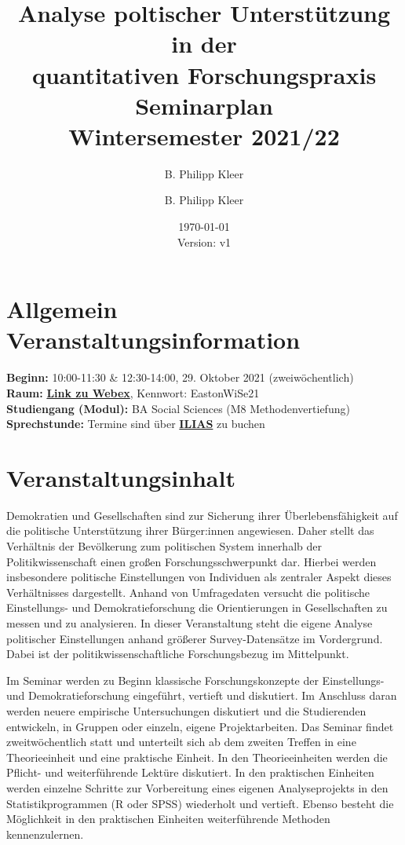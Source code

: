 \documentclass[11pt,a4paper]{article}
\author{B. Philipp Kleer}
\title{%
  Analyse poltischer Unterstützung in der\\quantitativen Forschungspraxis \\
  \large Seminarplan \\
  Wintersemester 2021/22}
\author{B. Philipp Kleer}
\date{\today \\ \small{Version: v1}}
\begin{document}
\maketitle

\section*{Allgemein Veranstaltungsinformation}
\textbf{Beginn:} 10:00-11:30 \& 12:30-14:00, 29. Oktober 2021 (zweiwöchentlich) \\
\textbf{Raum:} \href{https://uni-giessen.webex.com/uni-giessen/j.php?MTID=md4723c890a79880413a03711535386ad}{\textbf{Link zu Webex}}, Kennwort: EastonWiSe21  \\
\textbf{Studiengang (Modul):} BA Social Sciences (M8 Methodenvertiefung)\\
\textbf{Sprechstunde:} Termine sind über \href{https://ilias.uni-giessen.de/ilias/goto.php?target=prtf_415969_35654&client_id=JLUG}{\textbf{ILIAS}} zu buchen

\section*{Veranstaltungsinhalt}

Demokratien und Gesellschaften sind zur Sicherung ihrer Überlebensfähigkeit auf die politische Unterstützung ihrer Bürger:innen angewiesen. Daher stellt das Verhältnis der Bevölkerung zum politischen System innerhalb der Politikwissenschaft einen großen Forschungsschwerpunkt dar. Hierbei werden insbesondere politische Einstellungen von Individuen als zentraler Aspekt dieses Verhältnisses dargestellt. Anhand von Umfragedaten versucht die politische Einstellungs- und Demokratieforschung die Orientierungen in Gesellschaften zu messen und zu analysieren. In dieser Veranstaltung steht die eigene Analyse politischer Einstellungen anhand größerer Survey-Datensätze im Vordergrund. Dabei ist der politikwissenschaftliche Forschungsbezug im Mittelpunkt. 

Im Seminar werden zu Beginn klassische Forschungskonzepte der Einstellungs- und Demokratieforschung eingeführt, vertieft und diskutiert. Im Anschluss daran werden neuere empirische Untersuchungen diskutiert und die Studierenden entwickeln, in Gruppen oder einzeln, eigene Projektarbeiten. Das Seminar findet zweitwöchentlich statt und unterteilt sich ab dem zweiten Treffen in eine Theorieeinheit und eine praktische Einheit. In den Theorieeinheiten werden die Pflicht- und weiterführende Lektüre diskutiert. In den praktischen Einheiten werden einzelne Schritte zur Vorbereitung eines eigenen Analyseprojekts in den Statistikprogrammen (R oder SPSS) wiederholt und vertieft. Ebenso besteht die Möglichkeit in den praktischen Einheiten weiterführende Methoden kennenzulernen.
\end{document}
